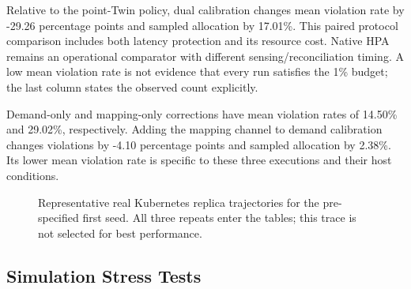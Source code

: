 \documentclass[11pt,a4paper]{article}
\begin{document}
Relative to the point-Twin policy, dual calibration changes mean violation rate by -29.26 percentage points and sampled allocation by 17.01\%. This paired protocol comparison includes both latency protection and its resource cost. Native HPA remains an operational comparator with different sensing/reconciliation timing. A low mean violation rate is not evidence that every run satisfies the 1\% budget; the last column states the observed count explicitly.

Demand-only and mapping-only corrections have mean violation rates of 14.50\% and 29.02\%, respectively. Adding the mapping channel to demand calibration changes violations by -4.10 percentage points and sampled allocation by 2.38\%. Its lower mean violation rate is specific to these three executions and their host conditions.

\begin{figure}[htbp]\centering{}\caption{Representative real Kubernetes replica trajectories for the pre-specified first seed. All three repeats enter the tables; this trace is not selected for best performance.}\label{fig:trajectory}\end{figure}

\subsection{Simulation Stress Tests}
\end{document}
